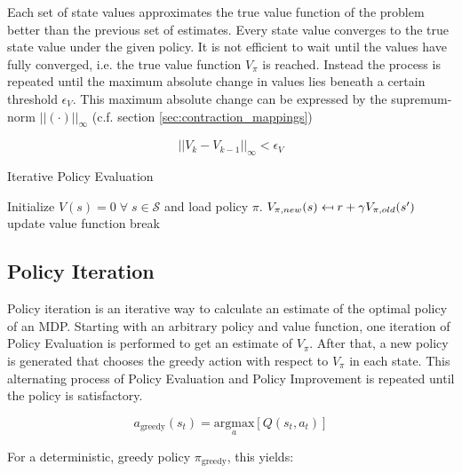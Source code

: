 Each set of state values approximates the true value function of the problem better than the previous set of estimates. Every state value converges to the true state value under the given policy. It is not efficient to wait until the values have fully converged, i.e. the true value function $V_\pi$ is reached. Instead the process is repeated until the maximum absolute change in values lies beneath a certain threshold $\epsilon_V$. This maximum absolute change can be expressed by the supremum-norm $||(\cdot)||_\infty$ (c.f. section \ref{sec:contraction_mappings})

\begin{equation}
||V_{k}-V_{k-1}||_\infty<\epsilon_V
\label{eq:pe_stopping_criterion}
\end{equation}

\begin{algorithm}
	\caption{Iterative Policy Evaluation}
	\begin{algorithmic}[0] %
		\State Initialize $V(s) = 0 \; \forall \; s \in \mathcal{S}$ and load policy $\pi$.
					\State $V_{\pi,new}(s) \mathrel{\reflectbox{\ensuremath{\mapsto}}} r+\gamma V_ {\pi,old}(s')$
				\EndFor
				\State update value function
					\State break
				\EndIf
			\EndWhile
		\EndFunction
	\end{algorithmic}
	\label{algo:pe}
\end{algorithm}

\subsection{Policy Iteration}
\label{sec:PI}
Policy iteration is an iterative way to calculate an estimate of the optimal policy of an MDP. Starting with an arbitrary policy and value function, one iteration of Policy Evaluation is performed to get an estimate of $V_\pi$. After that, a new policy is generated that chooses the greedy action with respect to $V_\pi$ in each state. This alternating process of Policy Evaluation and Policy Improvement is repeated until the policy is satisfactory.

\begin{equation}
a_{\text{greedy}}(s_t) = \underset{a}{\text{argmax}}[Q(s_t,a_t)]
\end{equation}

For a deterministic, greedy policy $\pi_{\text{greedy}}$, this yields:

